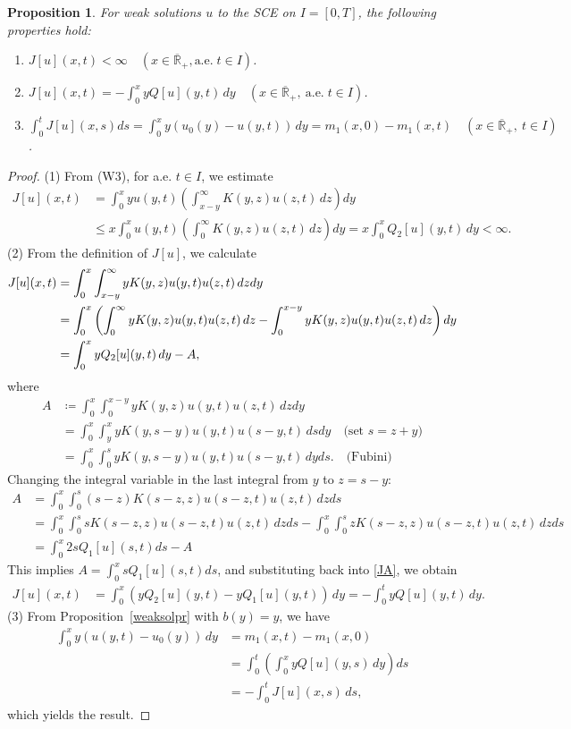 \documentclass[a4paper,11pt]{article}
\newtheorem{prop}[thm]{Proposition}
\def\Rb{\overline{{\mathbb R}}_+}
\begin{document}
\begin{prop}\label{weaksolprop}
For weak solutions $u$ to the SCE on $I=[0,T]$, the following properties hold:
\begin{enumerate}[(1)]   
\item 
$J[u](x,t)<\infty
\quad (x\in\Rb,\text{a.e.}\;t\in I)$.
\item 
$\displaystyle J[u](x,t)=-\int_{0}^{x}yQ[u](y,t)\,dy
\quad (x\in\Rb,~\text{a.e.}\;t\in I)$.
\item 
$\displaystyle 
\int_{0}^{t}J[u](x,s)ds 
= \int_0^x y (u_0(y)-u(y,t))\,dy
= m_1(x,0)-m_1(x,t)
\quad (x\in\Rb,~t\in I)$.
\end{enumerate}
\end{prop}
\begin{proof}
(1) From (W3), for a.e. $t\in I$, we estimate
\begin{align*}
J[u](x,t)
&=
\int_{0}^{x}yu(y,t)\left(\int_{x-y}^{\infty}K(y,z)u(z,t)\,dz\right) dy\\
&\le
x\int_{0}^{x}u(y,t)
\left(\int_{0}^{\infty}K(y,z)u(z,t)\,dz\right)dy
=
x\int_{0}^{x}Q_2[u](y,t)\,dy <\infty.
\end{align*}
\noindent (2) 
From the definition of $J[u]$, we calculate
\begin{align}
J[u](x,t)&=\int_{0}^{x}\int_{x-y}^{\infty}yK(y,z)u(y,t)u(z,t)\,dzdy\notag\\
&=\int_{0}^{x}\left(\int_{0}^{\infty}yK(y,z)u(y,t)u(z,t)\,dz-\int_{0}^{x-y}yK(y,z)u(y,t)u(z,t)\,dz\right)dy\notag\\
&=\int_{0}^{x}yQ_2[u](y,t)\,dy-A,\label{JA}
\end{align}
where
\begin{align*}
A&\coloneqq\int_0^x\int_{0}^{x-y}yK(y,z)u(y,t)u(z,t)\,dzdy\\
&=\int_{0}^{x}\int_{y}^{x}yK(y,s-y)u(y,t)u(s-y,t)\,dsdy\quad\mbox{(set $s=z+y$)}\\
&=\int_{0}^{x}\int_{0}^{s}yK(y,s-y)u(y,t)u(s-y,t)\,dyds.\quad\mbox{(Fubini)}
\end{align*}
Changing the integral variable in the last integral from $y$ to $z=s-y$:
\begin{align*}
A&=\int_{0}^{x}\int_{0}^{s}(s-z)K(s-z,z)u(s-z,t)u(z,t)\,dzds\\
&=\int_{0}^{x}\int_{0}^{s}sK(s-z,z)u(s-z,t)u(z,t)\,dzds-\int_{0}^{x}\int_{0}^{s}zK(s-z,z)u(s-z,t)u(z,t)\,dzds\\
&=\int_{0}^{x}2sQ_1[u](s,t)ds-A
\end{align*}
This implies 
$A=\int_{0}^{x}sQ_1[u](s,t)ds$, and substituting back into \eqref{JA}, we obtain
\begin{align*}
    J[u](x,t)&=\int_{0}^{x}\left(yQ_2[u](y,t)-yQ_1[u](y,t)\right)\,dy
    =-\int_{0}^{t}yQ[u](y,t)\,dy.
\end{align*}
\noindent
(3) From Proposition~\ref{weaksolpr} with $b(y)=y$, we have
\begin{align*}
\int_0^x y (u(y,t)-u_0(y))\,dy
&=m_1(x,t)-m_1(x,0)\\
&=
\int_{0}^{t} \left(\int_0^x yQ[u](y,s)\,dy\right) ds\\
&=
-\int_{0}^{t} J[u](x,s)\,ds,
\end{align*}
which yields the result.
\end{proof}
\end{document}
